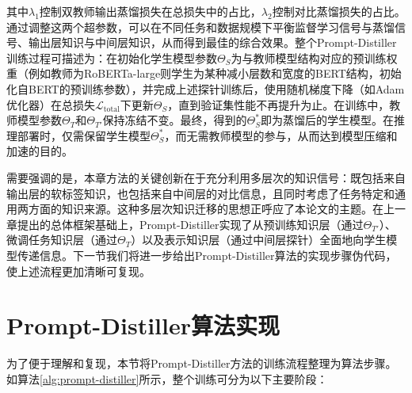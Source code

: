 \documentclass[../main.tex]{subfiles}
\begin{document}
其中$\lambda_1$控制双教师输出蒸馏损失在总损失中的占比，$\lambda_2$控制对比蒸馏损失的占比。通过调整这两个超参数，可以在不同任务和数据规模下平衡监督学习信号与蒸馏信号、输出层知识与中间层知识，从而得到最佳的综合效果。整个Prompt-Distiller训练过程可描述为：在初始化学生模型参数$\Theta_S$为与教师模型结构对应的预训练权重（例如教师为RoBERTa-large则学生为某种减小层数和宽度的BERT结构，初始化自BERT的预训练参数），并完成上述探针训练后，使用随机梯度下降（如Adam优化器）在总损失$\mathcal{L}_{\text{total}}$下更新$\Theta_S$，直到验证集性能不再提升为止。在训练中，教师模型参数$\Theta_T$和$\Theta_{T'}$保持冻结不变。最终，得到的$\Theta_S^*$即为蒸馏后的学生模型。在推理部署时，仅需保留学生模型$\Theta_S^*$，而无需教师模型的参与，从而达到模型压缩和加速的目的。

需要强调的是，本章方法的关键创新在于充分利用多层次的知识信号：既包括来自输出层的软标签知识，也包括来自中间层的对比信息，且同时考虑了任务特定和通用两方面的知识来源。这种多层次知识迁移的思想正呼应了本论文的主题。在上一章提出的总体框架基础上，Prompt-Distiller实现了从预训练知识层（通过$\Theta_{T'}$）、微调任务知识层（通过$\Theta_T$）以及表示知识层（通过中间层探针）全面地向学生模型传递信息。下一节我们将进一步给出Prompt-Distiller算法的实现步骤伪代码，使上述流程更加清晰可复现。

\section{Prompt-Distiller算法实现}
\label{sec:3-4}
为了便于理解和复现，本节将Prompt-Distiller方法的训练流程整理为算法步骤。如算法\ref{alg:prompt-distiller}所示，整个训练可分为以下主要阶段：
\end{document}
